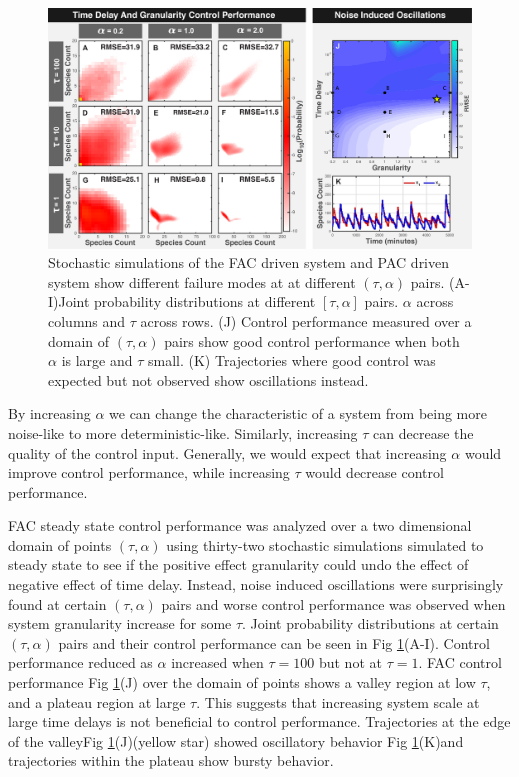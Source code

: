 \documentclass[12pt]{article}
\begin{document}
\begin{figure}
\begin{center}
\includegraphics[width=1\textwidth]{DelayAndGranularity.pdf}
\vspace{-0.1in}
\caption{Stochastic simulations of the FAC driven system and PAC driven system show different failure modes at at different $(\tau,\alpha)$ pairs. (A-I)Joint probability distributions at different $[\tau,\alpha]$ pairs. $\alpha$ across columns and $\tau$ across rows. (J) Control performance measured over a domain of $(\tau,\alpha)$ pairs show good control performance when both $\alpha$ is large and $\tau$ small. (K) Trajectories where good control was expected but not observed show oscillations instead.}
\label{DG}
\end{center}
\vspace{-0.2in}
\end{figure}

By increasing $\alpha$ we can change the characteristic of a system from being more noise-like to more deterministic-like. Similarly, increasing $\tau$ can decrease the quality of the control input. Generally, we would expect that increasing $\alpha$ would improve control performance, while increasing $\tau$ would decrease control performance. 

FAC steady state control performance was analyzed over a two dimensional domain of points $(\tau,\alpha)$ using thirty-two stochastic simulations simulated to steady state to see if the positive effect granularity could undo the effect of negative effect of time delay. Instead, noise induced oscillations were surprisingly found at certain $(\tau,\alpha)$ pairs and worse control performance was observed when system granularity increase for some $\tau$.  Joint probability distributions at certain $(\tau,\alpha)$ pairs and their control performance can be seen in Fig \ref{DG}(A-I). Control performance reduced as $\alpha$ increased when $\tau=100$ but not at $\tau=1$. FAC control performance Fig \ref{DG}(J) over the domain of points shows a valley region at low $\tau$, and a plateau region at large $\tau$. This suggests that increasing system scale at large time delays is not beneficial to control performance.  Trajectories at the edge of the valleyFig \ref {DG}(J)(yellow star) showed oscillatory behavior Fig \ref {DG}(K)and trajectories within the plateau show bursty behavior. 
\end{document}
